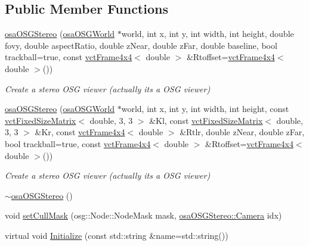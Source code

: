 \subsection*{Public Member Functions}
\begin{DoxyCompactItemize}
\item 
\hyperlink{classosa_o_s_g_stereo_a679f7f90565f4666470a5c5204519139}{osa\+O\+S\+G\+Stereo} (\hyperlink{classosa_o_s_g_world}{osa\+O\+S\+G\+World} $\ast$world, int x, int y, int width, int height, double fovy, double aspect\+Ratio, double z\+Near, double z\+Far, double baseline, bool trackball=true, const \hyperlink{classvct_frame4x4}{vct\+Frame4x4}$<$ double $>$ \&Rtoffset=\hyperlink{classvct_frame4x4}{vct\+Frame4x4}$<$ double $>$())
\begin{DoxyCompactList}\small\item\em Create a stereo O\+S\+G viewer (actually it\textquotesingle{}s a O\+S\+G viewer) \end{DoxyCompactList}\item 
\hyperlink{classosa_o_s_g_stereo_a487965aaa17602706dedfd33feb07951}{osa\+O\+S\+G\+Stereo} (\hyperlink{classosa_o_s_g_world}{osa\+O\+S\+G\+World} $\ast$world, int x, int y, int width, int height, const \hyperlink{classvct_fixed_size_matrix}{vct\+Fixed\+Size\+Matrix}$<$ double, 3, 3 $>$ \&Kl, const \hyperlink{classvct_fixed_size_matrix}{vct\+Fixed\+Size\+Matrix}$<$ double, 3, 3 $>$ \&Kr, const \hyperlink{classvct_frame4x4}{vct\+Frame4x4}$<$ double $>$ \&Rtlr, double z\+Near, double z\+Far, bool trackball=true, const \hyperlink{classvct_frame4x4}{vct\+Frame4x4}$<$ double $>$ \&Rtoffset=\hyperlink{classvct_frame4x4}{vct\+Frame4x4}$<$ double $>$())
\begin{DoxyCompactList}\small\item\em Create a stereo O\+S\+G viewer (actually it\textquotesingle{}s a O\+S\+G viewer) \end{DoxyCompactList}\item 
\hyperlink{classosa_o_s_g_stereo_a2ecf5436991a23c05bb8b6e369a9639a}{$\sim$osa\+O\+S\+G\+Stereo} ()
\item 
void \hyperlink{classosa_o_s_g_stereo_ab293b6407e47ea93b55e0c3768f07917}{set\+Cull\+Mask} (osg\+::\+Node\+::\+Node\+Mask mask, \hyperlink{classosa_o_s_g_stereo_a6f3072fa8cc1d46fcedff6b2d497f396}{osa\+O\+S\+G\+Stereo\+::\+Camera} idx)
\item 
virtual void \hyperlink{classosa_o_s_g_stereo_af0dd91d449cc12fc125326378e4214f2}{Initialize} (const std\+::string \&name=std\+::string())
\end{DoxyCompactItemize}

